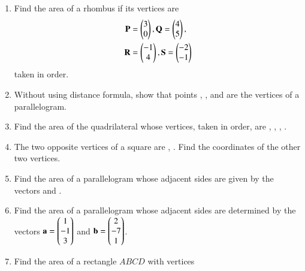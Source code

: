 \begin{enumerate}[label=\arabic*.,ref=\thesubsection.\theenumi]
\item Find the area of a rhombus if its vertices are 
\begin{align}
\mathbf{P} &= \begin{pmatrix}3\\0\end{pmatrix}, \mathbf{Q} =\begin{pmatrix}4\\5\end{pmatrix},
\\
\mathbf{R} &= \begin{pmatrix}-1\\4\end{pmatrix}, \mathbf{S} = \begin{pmatrix}-2\\-1\end{pmatrix} 
\end{align}
taken in order.
\\
\solution

\item Without using distance formula, show that points , ,  and  are the vertices of a parallelogram.
\\
\solution

\item  Find the area of the quadrilateral whose vertices, taken in order, are 
 ,  ,  ,  . 
\\
\solution

\item The two opposite vertices of a square are ,  . Find the coordinates of the other two vertices.
\\
\solution

\item Find the area of a parallelogram whose adjacent sides are given by the vectors  and .
\item Find the area of a parallelogram whose adjacent sides are determined by the vectors $\mathbf{a} = \begin{pmatrix}1\\-1\\3\end{pmatrix}$ and $\mathbf{b}=\begin{pmatrix}2\\-7\\1\end{pmatrix}$.
\item Find the area of a rectangle $ABCD$ with vertices

\end{enumerate}
